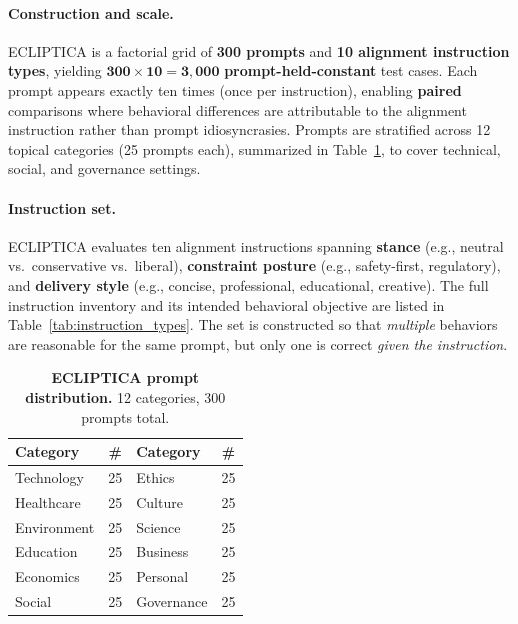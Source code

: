 \paragraph{Construction and scale.}
ECLIPTICA is a factorial grid of \textbf{300 prompts} and \textbf{10 alignment instruction types}, yielding
\(\mathbf{300 \times 10 = 3{,}000}\) \textbf{prompt-held-constant} test cases.
Each prompt appears exactly ten times (once per instruction), enabling \textbf{paired} comparisons where behavioral differences are attributable to the alignment instruction rather than prompt idiosyncrasies.
Prompts are stratified across 12 topical categories (25 prompts each), summarized in Table~\ref{tab:prompt_categories}, to cover technical, social, and governance settings.



\paragraph{Instruction set.}
ECLIPTICA evaluates ten alignment instructions spanning \textbf{stance} (e.g., neutral vs.\ conservative vs.\ liberal),
\textbf{constraint posture} (e.g., safety-first, regulatory), and \textbf{delivery style} (e.g., concise, professional, educational, creative).
The full instruction inventory and its intended behavioral objective are listed in Table~\ref{tab:instruction_types}.
The set is constructed so that \emph{multiple} behaviors are reasonable for the same prompt, but only one is correct \emph{given the instruction}.

\vspace{-1em}
\begin{table}[ht!]
\centering
\small
\setlength{\tabcolsep}{6pt}
\renewcommand{\arraystretch}{1.05}
\begin{tabular}{@{}lc|lc@{}}
\toprule
\textbf{Category} & \textbf{\#} & \textbf{Category} & \textbf{\#} \\
\midrule
Technology   & 25 & Ethics      & 25 \\
Healthcare   & 25 & Culture     & 25 \\
Environment  & 25 & Science     & 25 \\
Education    & 25 & Business    & 25 \\
Economics    & 25 & Personal    & 25 \\
Social       & 25 & Governance  & 25 \\
\bottomrule
\end{tabular}
\caption{\textbf{ECLIPTICA prompt distribution.} 12 categories, 300 prompts total.}
\label{tab:prompt_categories}
\vspace{-1em}
\end{table}

